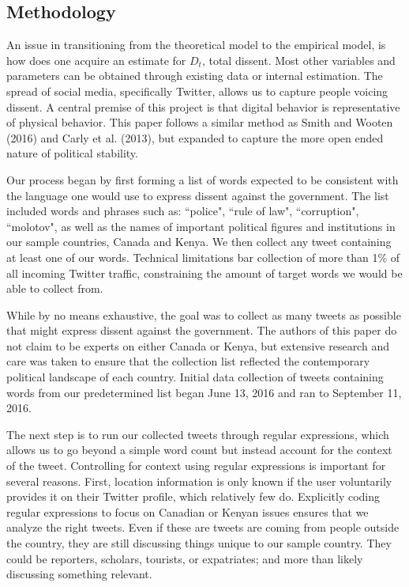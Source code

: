 \documentclass[12pt]{article}
\begin{document}
\begin{spacing}{1.5}
\section*{Methodology}

An issue in transitioning from the theoretical model to the empirical model, is how does one acquire an estimate for $D_t$, total dissent. Most other variables and parameters can be obtained through existing data or internal estimation. The spread of social media, specifically Twitter, allows us to capture people voicing dissent. A central premise of this project is that digital behavior is representative of physical behavior. This paper follows a similar method as Smith and Wooten (2016) and Carly et al. (2013), but expanded to capture the more open ended nature of political stability. 


Our process began by first forming a list of words expected to be consistent with the language one would use to express dissent against the government. The list included words and phrases such as: ``police", ``rule of law", ``corruption", ``molotov", as well as the names of important political figures and institutions in our sample countries, Canada and Kenya. We then collect any tweet containing at least one of our words. Technical limitations bar collection of more than 1\% of all incoming Twitter traffic, constraining the amount of target words we would be able to collect from. 

While by no means exhaustive, the goal was to collect as many tweets as possible that might express dissent against the government. The authors of this paper do not claim to be experts on either Canada or Kenya, but extensive research and care was taken to ensure that the collection list reflected the contemporary political landscape of each country. Initial data collection of tweets containing words from our predetermined list began June 13, 2016 and ran to September 11, 2016. 


The next step is to run our collected tweets through regular expressions, which allows us to go beyond a simple word count but instead account for the context of the tweet. Controlling for context using regular expressions is important for several reasons. First, location information is only known if the user voluntarily provides it on their Twitter profile, which relatively few do. Explicitly coding regular expressions to focus on Canadian or Kenyan issues ensures that we analyze the right tweets. Even if these are tweets are coming from people outside the country, they are still discussing things unique to our sample country. They could be reporters, scholars, tourists, or expatriates; and more than likely discussing something relevant.    


\end{spacing}
\end{document}

